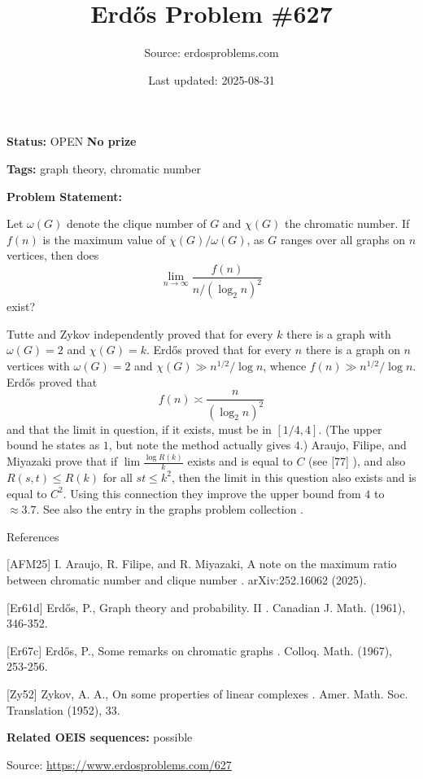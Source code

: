 \documentclass{article}
\title{Erd\H{o}s Problem \#627}
\date{Last updated: 2025-08-31}
\author{Source: erdosproblems.com}
\begin{document}
\maketitle

\noindent\textbf{Status:} OPEN \quad \textbf{No prize}

\noindent\textbf{Tags:} graph theory, chromatic number

\medskip

\noindent\textbf{Problem Statement:}

Let $\omega(G)$ denote the clique number of $G$ and $\chi(G)$ the chromatic number. If $f(n)$ is the maximum value of $\chi(G)/\omega(G)$, as $G$ ranges over all graphs on $n$ vertices, then does\[\lim_{n\to\infty}\frac{f(n)}{n/(\log_2n)^2}\]exist?




Tutte and Zykov \cite{Zy52} independently proved that for every $k$ there is a graph with $\omega(G)=2$ and $\chi(G)=k$. Erd\H{o}s \cite{Er61d} proved that for every $n$ there is a graph on $n$ vertices with $\omega(G)=2$ and $\chi(G)\gg n^{1/2}/\log n$, whence $f(n) \gg n^{1/2}/\log n$. Erd\H{o}s \cite{Er67c} proved that\[f(n) \asymp \frac{n}{(\log_2n)^2}\]and that the limit in question, if it exists, must be in $[1/4,4]$. (The upper bound he states as $1$, but \cite{AFM25} note the method actually gives $4$.) Araujo, Filipe, and Miyazaki \cite{AFM25} prove that if $\lim\frac{\log R(k)}{k}$ exists and is equal to $C$ (see [77] ), and also $R(s,t)\leq R(k)$ for all $st\leq k^2$, then the limit in this question also exists and is equal to $C^2$. Using this connection they improve the upper bound from $4$ to $\approx 3.7$. See also the entry in the graphs problem collection .




References

[AFM25] I. Araujo, R. Filipe, and R. Miyazaki, A note on the maximum ratio between chromatic number and clique number . arXiv:252.16062 (2025).

[Er61d] Erd\H{o}s, P., Graph theory and probability. II . Canadian J. Math. (1961), 346-352.

[Er67c] Erd\H{o}s, P., Some remarks on chromatic graphs . Colloq. Math. (1967), 253-256.

[Zy52] Zykov, A. A., On some properties of linear complexes . Amer. Math. Soc. Translation (1952), 33.

\noindent\textbf{Related OEIS sequences:} possible


\bigskip
\noindent\small{Source: \url{https://www.erdosproblems.com/627}}
\end{document}
